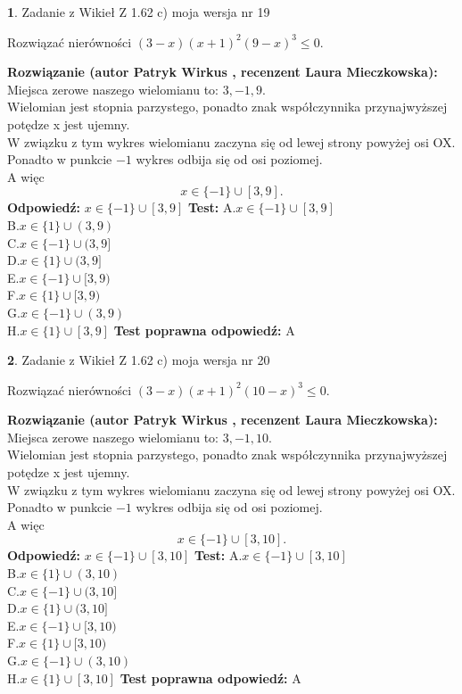 \documentclass[12pt, a4paper]{article}
\theoremstyle{definition} %
\newtheorem{zad}{}
\newcommand{\zadStart}[1]{\begin{zad}#1\newline}
\newcommand{\zadStop}{\end{zad}}
\newcommand{\rozwStart}[2]{\noindent \textbf{Rozwiązanie (autor #1 , recenzent #2): }\newline}
\newcommand{\rozwStop}{\newline}
\newcommand{\odpStart}{\noindent \textbf{Odpowiedź:}\newline}
\newcommand{\odpStop}{\newline}
\newcommand{\testStart}{\noindent \textbf{Test:}\newline}
\newcommand{\testStop}{\newline}
\newcommand{\kluczStart}{\noindent \textbf{Test poprawna odpowiedź:}\newline}
\newcommand{\kluczStop}{\newline}
\begin{document}
\zadStart{Zadanie z Wikieł Z 1.62 c) moja wersja nr 19}

Rozwiązać nierówności $(3-x)(x+1)^{2}(9-x)^{3}\le0$.
\zadStop
\rozwStart{Patryk Wirkus}{Laura Mieczkowska}
Miejsca zerowe naszego wielomianu to: $3, -1, 9$.\\
Wielomian jest stopnia parzystego, ponadto znak współczynnika przy\linebreak najwyższej potędze x jest ujemny.\\ W związku z tym wykres wielomianu zaczyna się od lewej strony powyżej osi OX.\\
Ponadto w punkcie $-1$ wykres odbija się od osi poziomej.\\
A więc $$x \in \{-1\} \cup [3,9].$$
\rozwStop
\odpStart
$x \in \{-1\} \cup [3,9]$
\odpStop
\testStart
A.$x \in \{-1\} \cup [3,9]$\\
B.$x \in \{1\} \cup (3,9)$\\
C.$x \in \{-1\} \cup (3,9]$\\
D.$x \in \{1\} \cup (3,9]$\\
E.$x \in \{-1\} \cup [3,9)$\\
F.$x \in \{1\} \cup [3,9)$\\
G.$x \in \{-1\} \cup (3,9)$\\
H.$x \in \{1\} \cup [3,9]$
\testStop
\kluczStart
A
\kluczStop



\zadStart{Zadanie z Wikieł Z 1.62 c) moja wersja nr 20}

Rozwiązać nierówności $(3-x)(x+1)^{2}(10-x)^{3}\le0$.
\zadStop
\rozwStart{Patryk Wirkus}{Laura Mieczkowska}
Miejsca zerowe naszego wielomianu to: $3, -1, 10$.\\
Wielomian jest stopnia parzystego, ponadto znak współczynnika przy\linebreak najwyższej potędze x jest ujemny.\\ W związku z tym wykres wielomianu zaczyna się od lewej strony powyżej osi OX.\\
Ponadto w punkcie $-1$ wykres odbija się od osi poziomej.\\
A więc $$x \in \{-1\} \cup [3,10].$$
\rozwStop
\odpStart
$x \in \{-1\} \cup [3,10]$
\odpStop
\testStart
A.$x \in \{-1\} \cup [3,10]$\\
B.$x \in \{1\} \cup (3,10)$\\
C.$x \in \{-1\} \cup (3,10]$\\
D.$x \in \{1\} \cup (3,10]$\\
E.$x \in \{-1\} \cup [3,10)$\\
F.$x \in \{1\} \cup [3,10)$\\
G.$x \in \{-1\} \cup (3,10)$\\
H.$x \in \{1\} \cup [3,10]$
\testStop
\kluczStart
A
\kluczStop
\end{document}
